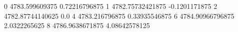 0 4783.599609375 0.72216796875
1 4782.75732421875 -0.1201171875
2 4782.87744140625 0.0
4 4783.216796875 0.33935546875
6 4784.90966796875 2.0322265625
8 4786.9638671875 4.08642578125
